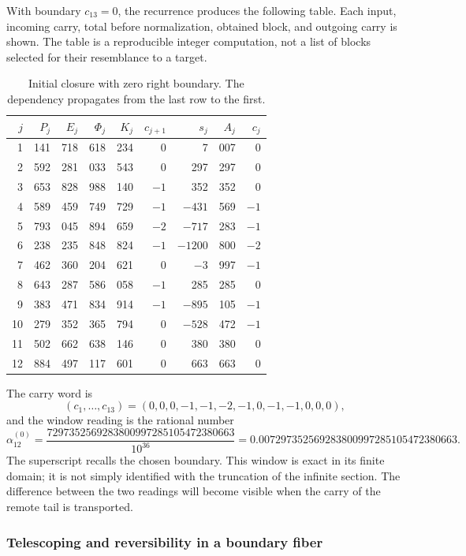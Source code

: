 With boundary \(c_{13}=0\), the recurrence produces the following table.
Each input, incoming carry, total before normalization,
obtained block, and outgoing carry is shown. The table is a reproducible integer
computation, not a list of blocks selected for their resemblance to
a target.

\begin{table}[htbp]
\centering
\small
\setlength{\tabcolsep}{3.5pt}
\begin{tabular}{r|rrrr|rr|rr}
\hline
\(j\)&\(P_j\)&\(E_j\)&\(\Phi_j\)&\(K_j\)&\(c_{j+1}\)&\(s_j\)&\(A_j\)&\(c_j\)\\
\hline
1&141&718&618&234&0&7&007&0\\
2&592&281&033&543&0&297&297&0\\
3&653&828&988&140&\(-1\)&352&352&0\\
4&589&459&749&729&\(-1\)&\(-431\)&569&\(-1\)\\
5&793&045&894&659&\(-2\)&\(-717\)&283&\(-1\)\\
6&238&235&848&824&\(-1\)&\(-1200\)&800&\(-2\)\\
7&462&360&204&621&0&\(-3\)&997&\(-1\)\\
8&643&287&586&058&\(-1\)&285&285&0\\
9&383&471&834&914&\(-1\)&\(-895\)&105&\(-1\)\\
10&279&352&365&794&0&\(-528\)&472&\(-1\)\\
11&502&662&638&146&0&380&380&0\\
12&884&497&117&601&0&663&663&0\\
\hline
\end{tabular}
\caption{Initial closure with zero right boundary. The dependency propagates from the last row to the first.}
\label{tab:alpha-ventana}
\end{table}

The carry word is
\[
 (c_1,\ldots,c_{13})=(0,0,0,-1,-1,-2,-1,0,-1,-1,0,0,0),
\]
and the window reading is the rational number
\begin{equation}
 \alpha_{12}^{(0)}
 =\frac{7297352569283800997285105472380663}{10^{36}}
 =0.007297352569283800997285105472380663.
 \label{eq:alpha-ventana-cero}
\end{equation}
The superscript recalls the chosen boundary. This window is exact in its
finite domain; it is not simply identified with the truncation of the
infinite section. The difference between the two readings will become visible when
the carry of the remote tail is transported.

\subsubsection{Telescoping and reversibility in a boundary fiber}
\label{subsec:alpha-telescopia}


